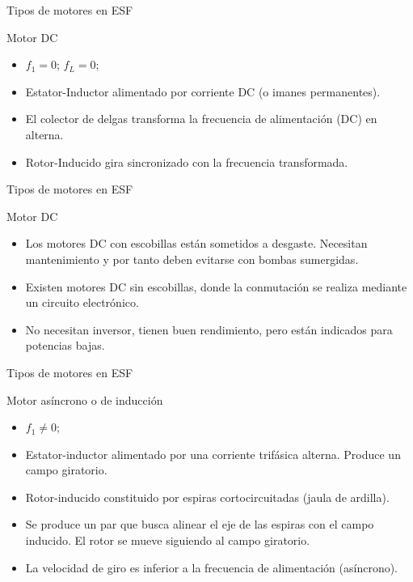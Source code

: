 \documentclass[xcolor={usenames,svgnames,dvipsnames}]{beamer}
\begin{document}
\begin{frame}[label=sec-2-1-5]{Tipos de motores en ESF}
\begin{block}{Motor DC}
\begin{itemize}
\item $f_{1}=0$; $f_{L}=0$;

\item \alert{Estator-Inductor} alimentado por \alert{corriente DC} (o imanes permanentes).

\item El \alert{colector de delgas} transforma la frecuencia de alimentación (DC) en alterna.

\item \alert{Rotor-Inducido gira sincronizado} con la frecuencia \guillemotleft{}transformada\guillemotright{}.
\end{itemize}
\end{block}
\end{frame}

\begin{frame}[label=sec-2-1-6]{Tipos de motores en ESF}
\begin{block}{Motor DC}
\begin{itemize}
\item Los \alert{motores DC con escobillas están sometidos a desgaste}. Necesitan mantenimiento y por tanto deben evitarse con bombas sumergidas.

\item Existen \alert{motores DC sin escobillas}, donde la conmutación se realiza mediante un \alert{circuito electrónico}.

\item No necesitan inversor, tienen buen rendimiento, pero están indicados para \alert{potencias bajas}.
\end{itemize}
\end{block}
\end{frame}

\begin{frame}[label=sec-2-1-7]{Tipos de motores en ESF}
\begin{block}{Motor asíncrono o de inducción}
\begin{itemize}
\item $f_{1}\neq0$;

\item \alert{Estator-inductor} alimentado por una \alert{corriente trifásica alterna}.  Produce un campo giratorio.

\item \alert{Rotor-inducido} constituido por \alert{espiras cortocircuitadas} (jaula de ardilla).

\item Se produce un par que busca alinear el eje de las espiras con el campo inducido. El rotor se mueve siguiendo al campo giratorio.

\item La \alert{velocidad de giro es inferior a la frecuencia de alimentación} (asíncrono).
\end{itemize}
\end{block}
\end{frame}
\end{document}
